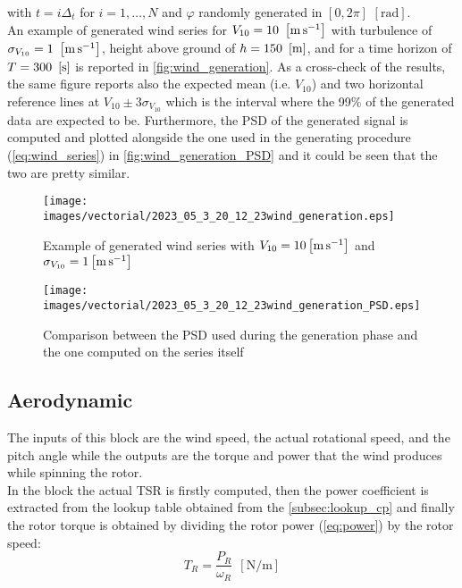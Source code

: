 with $t = i\Delta_t$ for $i=1,\dots,N$ and $\varphi$ randomly generated in $ \left[0, 2\pi\right]$ $\left[\si{\radian}\right]$. \\
An example of generated wind series for $V_{10}=10 \ \left[\si{\meter\per\second}\right]$ with turbulence of $\sigma_{V_{10}}=1 \ \mesunt{\meter\per\second}$, height above ground of $h=150 
 \ \left[\si{\meter}\right]$, and for a time horizon of $T = 300 \ \left[\si{\second}\right]$ is reported in \autoref{fig:wind_generation}. As a cross-check of the results, the same figure reports also the expected mean (i.e. $V_{10}$) and two horizontal reference lines at $V_{10}\pm3\sigma_{V_{10}}$ which is the interval where the 99\% of the generated data are expected to be. Furthermore, the PSD of the generated signal is computed and plotted alongside the one used in the generating procedure (\autoref{eq:wind_series}) in \autoref{fig:wind_generation_PSD} and it could be seen that the two are pretty similar. 
\begin{figure}[htb]
    \centering
    \texttt{[image: images/vectorial/2023\_05\_3\_20\_12\_23wind\_generation.eps]}
    \caption{Example of generated wind series with $V_{10}=10\left[\si{\meter\per\second}\right]$ and $\sigma_{V_{10}}=1\left[\si{\meter\per\second}\right]$ }
    \label{fig:wind_generation}
\end{figure}

\begin{figure}[htb]
    \centering
    \texttt{[image: images/vectorial/2023\_05\_3\_20\_12\_23wind\_generation\_PSD.eps]}
    \caption{Comparison between the PSD used during the generation phase and the one computed on the series itself}
    \label{fig:wind_generation_PSD}
\end{figure}

\subsection{Aerodynamic}
The inputs of this block are the wind speed, the actual rotational speed, and the pitch angle while the outputs are the torque and power that the wind produces while spinning the rotor. \\
In the block the actual \acrshort{TSR} is firstly computed, then the power coefficient is extracted from the lookup table obtained from the \autoref{subsec:lookup_cp} and finally the rotor torque is obtained by dividing the rotor power (\autoref{eq:power}) by the rotor speed:
\begin{equation}
    T_R = \frac{P_R}{\omega_R} \ \ \left[\si{\newton\per\meter}\right]
\end{equation}

